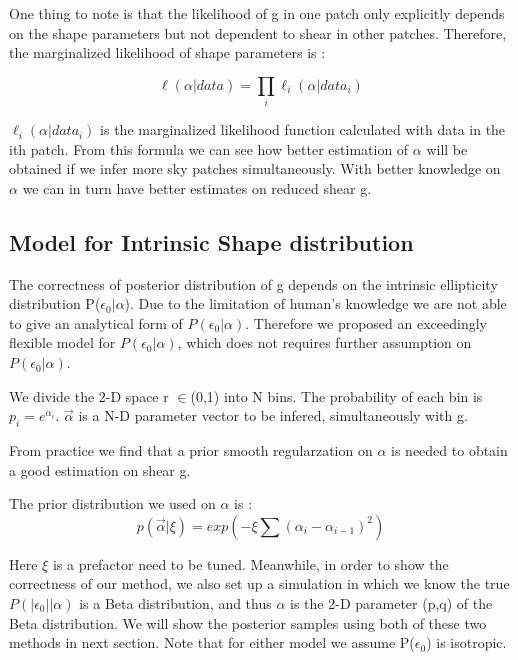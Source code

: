 \documentclass[useAMS,usenatbib]{mn2e}
\begin{document}
One thing to note is that the likelihood of g in one patch only explicitly depends
on the shape parameters but not dependent to shear in other patches. Therefore, the
marginalized likelihood of shape parameters is :

\begin{equation}
\ell(\alpha|data)=\prod_{i}\ell_{i}(\alpha|data_{i})
\end{equation}


$\ell_{i}(\alpha|data_{i})$ is the marginalized likelihood function
calculated with data in the ith patch. From this formula we can see
how better estimation of $\alpha$ will be obtained if we infer more
sky patches simultaneously. With better knowledge on $\alpha$ we
can in turn have better estimates on reduced shear g.


\subsection{Model for Intrinsic Shape distribution}

The correctness of posterior distribution of g depends on the intrinsic
ellipticity distribution P($\epsilon_{0}|\alpha$). Due to the limitation
of human's knowledge we are not able to give an analytical form of
$P(\epsilon_{0}|\alpha)$. Therefore we proposed an exceedingly flexible
model for $P(\epsilon_{0}|\alpha)$, which does not requires further
assumption on $P(\epsilon_{0}|\alpha)$.

We divide the 2-D space r $\in$(0,1) into N bins. The probability
of each bin is $p_{i}=e^{\alpha_{i}}$. $\overrightarrow{\alpha}$
is a N-D parameter vector to be infered, simultaneously with g.

From practice we find that a prior smooth regularzation on $\alpha$
is needed to obtain a good estimation on shear g.

The prior distribution we used on $\alpha$ is : 
\begin{equation}
p(\vec{\alpha}|\xi)=exp(-\xi\sum(\alpha_{i}-\alpha_{i-1})^{2})
\end{equation}

Here $\xi$ is a prefactor need to be tuned.
Meanwhile, in order to show the correctness of our method, we also
set up a simulation in which we know the true $P(|\epsilon_{0}||\alpha)$
is a Beta distribution, and thus $\alpha$ is the 2-D parameter (p,q)
of the Beta distribution. We will show the posterior samples using
both of these two methods in next section. Note that for either model
we assume P($\epsilon_{0}$) is isotropic.
\end{document}
